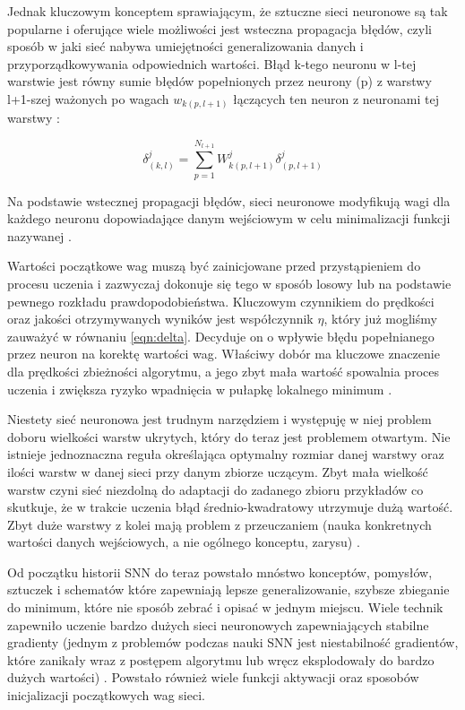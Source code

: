 Jednak kluczowym konceptem sprawiającym, że sztuczne sieci neuronowe są tak popularne i oferujące wiele możliwości jest wsteczna propagacja błędów, czyli sposób w jaki sieć nabywa umiejętności generalizowania danych i przyporządkowywania odpowiednich wartości. Błąd k-tego neuronu w l-tej warstwie jest równy sumie błędów popełnionych przez neurony (p) z warstwy l+1-szej ważonych po wagach $w_{k(p,l+1)}$ łączących ten neuron z neuronami tej warstwy \cite{Prezentacja:SNN}: 

\[
\delta_{(k,l)}^{j} = \sum_{p=1}^{N_{l+1}} W^{j}_{k(p, l+1)} \delta_{(p,l+1)}^{j}
\]

Na podstawie wstecznej propagacji błędów, sieci neuronowe modyfikują wagi dla każdego neuronu dopowiadające danym wejściowym w celu minimalizacji funkcji nazywanej .

Wartości początkowe wag muszą być zainicjowane przed przystąpieniem do procesu uczenia i zazwyczaj dokonuje się tego w sposób losowy lub na podstawie pewnego rozkładu prawdopodobieństwa. Kluczowym czynnikiem do prędkości oraz jakości otrzymywanych wyników jest współczynnik $\eta$, który już mogliśmy zauważyć w równaniu \ref{eqn:delta}. Decyduje on o wpływie błędu popełnianego przez neuron na korektę wartości wag. Właściwy dobór ma kluczowe znaczenie dla prędkości zbieżności algorytmu, a jego zbyt mała wartość spowalnia proces uczenia i zwiększa ryzyko
wpadnięcia w pułapkę lokalnego minimum \cite{Prezentacja:SNN}. 

Niestety sieć neuronowa jest trudnym narzędziem i występuję w niej problem doboru wielkości warstw ukrytych, który do teraz jest problemem otwartym. 
Nie istnieje jednoznaczna reguła określająca optymalny rozmiar danej warstwy oraz ilości warstw w danej sieci przy danym zbiorze uczącym. Zbyt mała wielkość warstw czyni sieć niezdolną do adaptacji do
zadanego zbioru przykładów co skutkuje, że w trakcie uczenia błąd
średnio-kwadratowy utrzymuje dużą wartość. Zbyt duże warstwy z kolei mają problem z przeuczaniem (nauka konkretnych wartości danych wejściowych, a nie ogólnego konceptu, zarysu) \cite{Prezentacja:SNN}.

Od początku historii SNN do teraz powstało mnóstwo konceptów, pomysłów, sztuczek i schematów które zapewniają lepsze generalizowanie, szybsze zbieganie do minimum, które nie sposób zebrać i opisać w jednym miejscu. Wiele technik zapewniło uczenie bardzo dużych sieci neuronowych zapewniających stabilne gradienty (jednym z problemów podczas nauki SNN jest niestabilność gradientów, które zanikały wraz z postępem algorytmu lub wręcz eksplodowały do bardzo dużych wartości) \cite{gradient}. Powstało również wiele funkcji aktywacji oraz sposobów inicjalizacji początkowych wag sieci.

